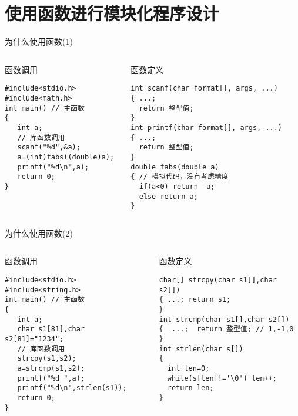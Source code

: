 
\section{使用函数进行模块化程序设计}

\begin{frame}{为什么使用函数(1)}
\tiny
\vspace{-0.2cm}
\begin{columns}[T]
\begin{beamerboxesrounded}{函数调用}
\begin{lstlisting}
#include<stdio.h>
#include<math.h>
int main() // 主函数
{
   int a;
   // 库函数调用
   scanf("%d",&a); 
   a=(int)fabs((double)a); 
   printf("%d\n",a);
   return 0; 
}
\end{lstlisting}
\end{beamerboxesrounded}
\begin{beamerboxesrounded}{函数定义}
\begin{lstlisting}
int scanf(char format[], args, ...)
{ ...;
  return 整型值;
}
int printf(char format[], args, ...)
{ ...;
  return 整型值;
}
double fabs(double a)
{ // 模拟代码，没有考虑精度
  if(a<0) return -a;
  else return a;
}
\end{lstlisting}
\end{beamerboxesrounded}
\end{columns}
\end{frame}

\begin{frame}{为什么使用函数(2)}
\tiny
\vspace{-0.2cm}
\begin{columns}[T]
\begin{beamerboxesrounded}{函数调用}
\begin{lstlisting}
#include<stdio.h>
#include<string.h>
int main() // 主函数
{
   int a;
   char s1[81],char s2[81]="1234";
   // 库函数调用 
   strcpy(s1,s2); 
   a=strcmp(s1,s2);
   printf("%d ",a);
   printf("%d\n",strlen(s1));
   return 0; 
}
\end{lstlisting}
\end{beamerboxesrounded}
\begin{beamerboxesrounded}{函数定义}
\begin{lstlisting}
char[] strcpy(char s1[],char s2[])
{ ...; return s1; 
}
int strcmp(char s1[],char s2[])
{  ...;  return 整型值; // 1,-1,0
}
int strlen(char s[])
{
  int len=0;
  while(s[len]!='\0') len++;
  return len;
}
\end{lstlisting}
\end{beamerboxesrounded}
\end{columns}
\end{frame}


